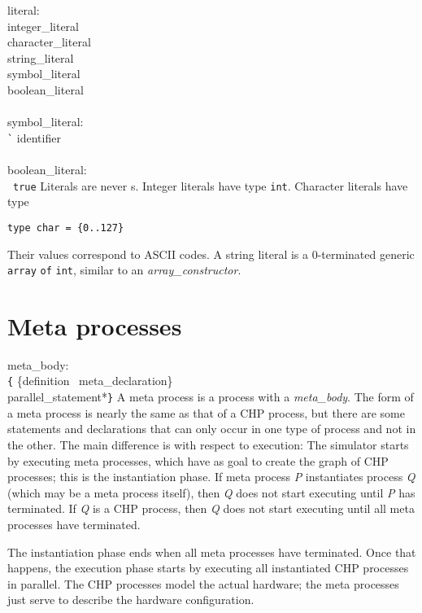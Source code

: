 \grammarstart
literal: \\
       \>integer\_literal \\
\orbox \>character\_literal \\
\orbox \>string\_literal \\
\orbox \>symbol\_literal \\
\orbox \>boolean\_literal \\
 \\
symbol\_literal: \\
      \>\verb|`| identifier \\
 \\
boolean\_literal: \\
       \orbox \ {\tt{}true}
\grammarend
Literals are never \lvalue s. Integer literals have type {\tt{}int}.
Character literals have type
\begin{verbatim}
type char = {0..127}
\end{verbatim}
Their values correspond to ASCII codes.
A string literal is a 0-terminated generic {\tt{}array} {\tt{}of} {\tt{}int},
similar to an {\it{}array\_constructor}.


\section{Meta processes}\label{sec:meta}

\grammarstart
meta\_body: \\
       \verb|{| \{definition \orbox \ meta\_declaration\}\SERIESOPT \\
      \>\qquad  parallel\_statement*\TSEQOPT \verb|}|
\grammarend
A meta process is a process with a {\it{}meta\_body}. The form of a meta process
is nearly the same as that of a CHP process, but there are some
statements and declarations that can only occur in one type of process
and not in the other. The main difference is with respect to execution:
The simulator starts by executing meta processes, which have as goal to
create the graph of CHP processes; this is the instantiation phase.
If meta process {\it{}P} instantiates process {\it{}Q} (which may be a meta process
itself), then {\it{}Q} does not start executing until {\it{}P} has terminated.
If {\it{}Q} is a CHP process, then {\it{}Q} does not start executing until
all meta processes have terminated.

The instantiation phase ends when all meta processes have terminated.
Once that happens, the execution phase starts by executing all instantiated
CHP processes in parallel. The CHP processes
model the actual hardware; the meta processes just serve to describe
the hardware configuration.

